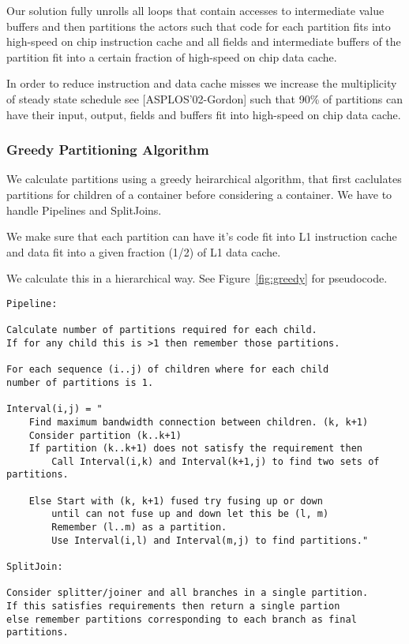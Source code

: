 \documentclass{sig-alternate}
\begin{document}
Our solution fully unrolls all loops that contain accesses to
intermediate value buffers and then partitions the actors such 
that code for each partition fits into high-speed on chip 
instruction cache and all fields and intermediate 
buffers of the partition fit into a certain fraction 
of high-speed on chip data cache.

In order to reduce instruction and data cache misses we increase
the multiplicity of steady state schedule see [ASPLOS'02-Gordon] such 
that 90\% of partitions can have their input, output, fields
and buffers fit into high-speed on chip data cache.

\subsubsection{Greedy Partitioning Algorithm}

We calculate partitions using a greedy heirarchical 
algorithm, that first caclulates partitions for children
of a container before considering a container.
We have to handle Pipelines and SplitJoins.

We make sure that each partition can have it's code fit into
L1 instruction cache and data fit into a given fraction (1/2)
of L1 data cache.

We calculate this in a hierarchical way. See Figure~\ref{fig:greedy}
for pseudocode.

\begin{figure*}[t]
\begin{verbatim}
Pipeline:

Calculate number of partitions required for each child.
If for any child this is >1 then remember those partitions.

For each sequence (i..j) of children where for each child 
number of partitions is 1.

Interval(i,j) = "
    Find maximum bandwidth connection between children. (k, k+1)
    Consider partition (k..k+1) 
    If partition (k..k+1) does not satisfy the requirement then
        Call Interval(i,k) and Interval(k+1,j) to find two sets of partitions.

    Else Start with (k, k+1) fused try fusing up or down
        until can not fuse up and down let this be (l, m)
        Remember (l..m) as a partition.
        Use Interval(i,l) and Interval(m,j) to find partitions."

SplitJoin:

Consider splitter/joiner and all branches in a single partition.
If this satisfies requirements then return a single partion
else remember partitions corresponding to each branch as final
partitions.
\end{verbatim}
\caption{Pseudocode of a greedy algorithm to find partitions}
\label{fig:greedy}
\end{figure*}
\end{document}
